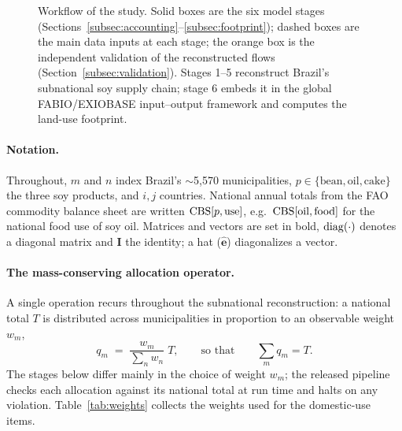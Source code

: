 \begin{figure}[htbp]
\caption{Workflow of the study. Solid boxes are the six model stages
(Sections~\ref{subsec:accounting}--\ref{subsec:footprint}); dashed boxes are
the main data inputs at each stage; the orange box is the independent
validation of the reconstructed flows (Section~\ref{subsec:validation}).
Stages 1--5 reconstruct Brazil's subnational soy supply chain; stage 6 embeds
it in the global FABIO/EXIOBASE input--output framework and computes the
land-use footprint.}\label{fig:workflow}
\end{figure}

\paragraph{Notation.}
Throughout, $m$ and $n$ index Brazil's $\sim$5{,}570 municipalities,
$p\in\{\text{bean},\text{oil},\text{cake}\}$ the three soy products, and
$i,j$ countries. National annual totals from the FAO commodity balance sheet
are written $\mathrm{CBS}[p,\text{use}]$, e.g.\ $\mathrm{CBS}[\text{oil},\text{food}]$
for the national food use of soy oil. Matrices and vectors are set in bold,
$\operatorname{diag}(\cdot)$ denotes a diagonal matrix and $\mathbf{I}$ the identity; a hat
($\hat{\mathbf{e}}$) diagonalizes a vector.

\paragraph{The mass-conserving allocation operator.}
A single operation recurs throughout the subnational reconstruction: a
national total $T$ is distributed across municipalities in proportion to an
observable weight $w_m$,
\begin{equation}\label{eq:split}
  q_m \;=\; \frac{w_m}{\sum_{n}w_{n}}\;T,
  \qquad\text{so that}\qquad \sum_m q_m = T .
\end{equation}
The stages below differ mainly in the choice of weight $w_m$; the released
pipeline checks each allocation against its national total at run time and
halts on any violation. Table~\ref{tab:weights}
collects the weights used for the domestic-use items.

